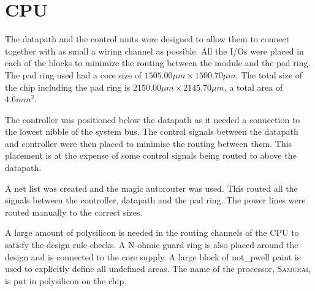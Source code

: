 

\section{CPU}


The datapath and the control units were designed to allow them to connect together with as small a wiring channel as possible. 
All the I/Os were placed in each of the blocks to minimize the routing between the module and the pad ring. 
The pad ring used had a core size of $1505.00\mu m \times 1500.70\mu m$. 
The total size of the chip including the pad ring is $ 2150.00\mu m \times 2145.70\mu m$, a total area of $4.6mm^2$.

The controller was positioned below the datapath as it needed a connection to the lowest nibble of the system bus. 
The control signals between the datapath and controller were then placed to minimise the routing between them. 
This placement is at the expense of some control signals being routed to above the datapath. 

A net list was created and the magic autorouter was used.
This routed all the signals between the controller, datapath and the pad ring. 
The power lines were routed manually to the correct sizes. 

A large amount of polysilicon is needed in the routing channels of the CPU to satisfy the design rule checks. 
A N-ohmic guard ring is also placed around the design and is connected to the core supply.
A large block of not\_pwell paint is used to explicitly define all undefined areas. 
The name of the processor, \textsc{Samurai}, is put in polysilicon on the chip.
